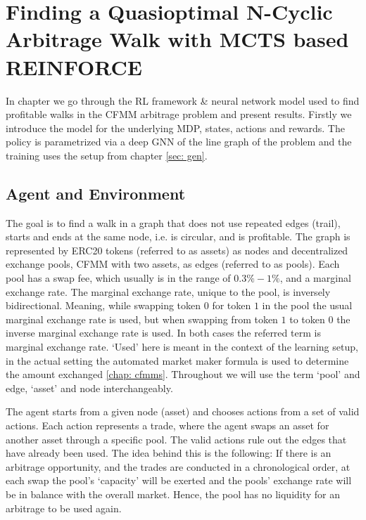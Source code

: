 \chapter{Finding a Quasioptimal N-Cyclic Arbitrage Walk with MCTS based REINFORCE}
In chapter we go through the RL framework \& neural network model used
to find profitable walks in the CFMM arbitrage problem and present results.
Firstly we introduce the model for the underlying MDP, states, actions and
rewards. The policy is parametrized via a deep GNN of the line graph of
the problem and the training uses the setup from chapter
\ref{sec: gen}.

\section{Agent and Environment}
The goal is to find a walk in a graph that does not use repeated edges
(trail), starts and ends at the same node, i.e. is circular, and is
profitable. The graph is represented by ERC20 \cite{erc20} tokens (referred
to as assets) as nodes and decentralized exchange pools, CFMM with two
assets, as edges (referred to as pools). Each pool has a swap fee, which
usually is in the range of $0.3\%-1\%$, and a marginal exchange rate. The
marginal exchange rate, unique to the pool, is inversely bidirectional.
Meaning, while swapping token $0$ for token $1$ in the pool the usual
marginal exchange rate is used, but when swapping from token $1$ to token $0$
the inverse marginal exchange rate is used. In both cases the referred term
is marginal exchange rate. `Used' here is meant in the context of the
learning setup, in the actual setting the automated market maker formula is
used to determine the amount exchanged \ref{chap: cfmms}. Throughout we will
use the term `pool' and edge, `asset' and node interchangeably.
\newline

The agent starts from a given node (asset) and chooses actions from a set of
valid actions. Each action represents a trade, where the agent swaps an asset
for another asset through a specific pool. The valid actions rule out the
edges that have already been used. The idea behind this is the following: If
there is an arbitrage opportunity, and the trades are conducted in a
chronological order, at each swap the pool's `capacity' will be exerted and
the pools' exchange rate will be in balance with the overall market. Hence, the
pool has no liquidity for an arbitrage to be used again.
\newline


